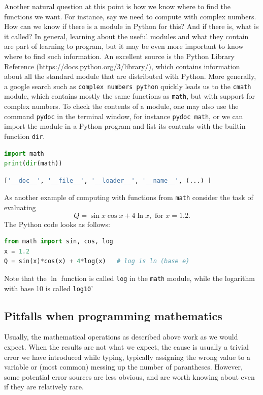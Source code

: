 \documentclass[graybox,envcountchap,sectrefs,final]{svmonodo}
\begin{document}
Another natural question at this point is how we know where to find the functions we want. For instance,
say we need to compute with complex numbers. How can we know if there is a module in Python for this? And
if there is, what is it called? In general, learning about the useful modules and what they contain are part
of learning to program, but it may be even more important to know where to find such information. An excellent source
is the Python Library Reference (https://docs.python.org/3/library/), which contains information about all the standard module
that are distributed with Python. More generally, a google search such as \texttt{complex numbers python} quickly leads us
to the \texttt{cmath} module, which contains mostly the same functions as \texttt{math}, but with support for complex numbers.
To check the contents of a module, one may also use the command \texttt{pydoc} in the terminal window, for instance \texttt{pydoc math},
or we can import the module in a Python program and list its contents with the builtin function \texttt{dir}.
\begin{lstlisting}[language=Python,style=blue1]
import math
print(dir(math))
\end{lstlisting}
\begin{lstlisting}[language=Python,style=gray]
['__doc__', '__file__', '__loader__', '__name__', (...) ]
\end{lstlisting}

As another example of computing with functions from \texttt{math} consider the task of evaluating
\[ Q = \sin x\cos x + 4\ln x, \mbox{ for } x = 1.2. \]
The Python code looks as follows:
\begin{lstlisting}[language=Python,style=blue1bar]
from math import sin, cos, log
x = 1.2
Q = sin(x)*cos(x) + 4*log(x)   # log is ln (base e)
\end{lstlisting}
Note that the $\ln$ function is called \texttt{log} in the \texttt{math} module, while the logarithm with base 10 is called \texttt{log10}'

\subsection{Pitfalls when programming mathematics}

Usually, the mathematical operations as described above work as we would expect. When the results are not what we expect, the
cause is usually a trivial error we have introduced while typing, typically assigning the wrong value to a variable or (most common)
messing up the number of parantheses. However, some potential error sources are less obvious, and are worth knowing about even if they are
relatively rare.
\end{document}
